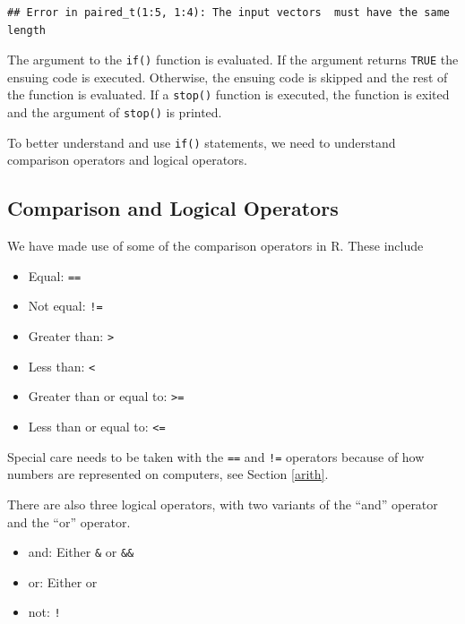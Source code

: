 \documentclass[
]{krantz}
\providecommand{\tightlist}{%
  \setlength{\itemsep}{0pt}\setlength{\parskip}{0pt}}
\begin{document}
\begin{verbatim}
## Error in paired_t(1:5, 1:4): The input vectors  must have the same length
\end{verbatim}

The argument to the \texttt{if()} function is evaluated. If the argument returns \texttt{TRUE} the ensuing code is executed. Otherwise, the ensuing code is skipped and the rest of the function is evaluated. If a \texttt{stop()} function is executed, the function is exited and the argument of \texttt{stop()} is printed.

To better understand and use \texttt{if()} statements, we need to understand comparison operators and logical operators.

\hypertarget{comparison-and-logical-operators}{%
\subsection{Comparison and Logical Operators}\label{comparison-and-logical-operators}}

We have made use of some of the comparison operators in R. These include

\begin{itemize}
\tightlist
\item
  Equal: \texttt{==}
\item
  Not equal: \texttt{!=}
\item
  Greater than: \texttt{\textgreater{}}
\item
  Less than: \texttt{\textless{}}
\item
  Greater than or equal to: \texttt{\textgreater{}=}
\item
  Less than or equal to: \texttt{\textless{}=}
\end{itemize}

Special care needs to be taken with the \texttt{==} and \texttt{!=} operators because of how numbers are represented on computers, see Section \ref{arith}.

There are also three logical operators, with two variants of the ``and'' operator and the ``or'' operator.

\begin{itemize}
\tightlist
\item
  and: Either \texttt{\&} or \texttt{\&\&}
\item
  or: Either \texttt{\textbar{}} or \texttt{\textbar{}\textbar{}}
\item
  not: \texttt{!}
\end{itemize}
\end{document}
